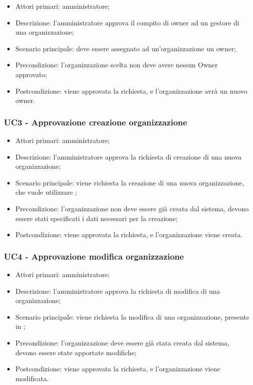 \begin{itemize}
\item Attori primari: amministratore;
\item Descrizione: l'amministratore approva il compito di owner ad un gestore di una organizzazione;
\item Scenario principale: deve essere assegnato ad un'organizzazione un owner;
\item Precondizione: l'organizzazione scelta non deve avere nessun Owner approvato;
\item Postcondizione: viene approvata la richiesta, e l'organizzazione avrà un nuovo owner.

\end{itemize}

\subsubsection{UC3 - Approvazione creazione organizzazione}

\begin{itemize}
\item Attori primari: amministratore;
\item Descrizione: l'amministratore approva la richiesta di creazione di una nuova organizzazione;
\item Scenario principale: viene richiesta la creazione di una nuova organizzazione, che vuole utilizzare ;
\item Precondizione: l'organizzazione non deve essere già creata dal sistema, devono essere stati specificati i dati necessari per la creazione;
\item Postcondizione: viene approvata la richiesta, e l'organizzazione viene creata.

\end{itemize}

\subsubsection{UC4 - Approvazione modifica organizzazione}

\begin{itemize}
\item Attori primari: amministratore;
\item Descrizione: l'amministratore approva la richiesta di modifica di una organizzazione;
\item Scenario principale: viene richiesta la modifica di una organizzazione, presente in ;
\item Precondizione: l'organizzazione deve essere già stata creata dal sistema, devono essere state apportate modifiche;
\item Postcondizione: viene approvata la richiesta, e l'organizzazione viene modificata.

\end{itemize}